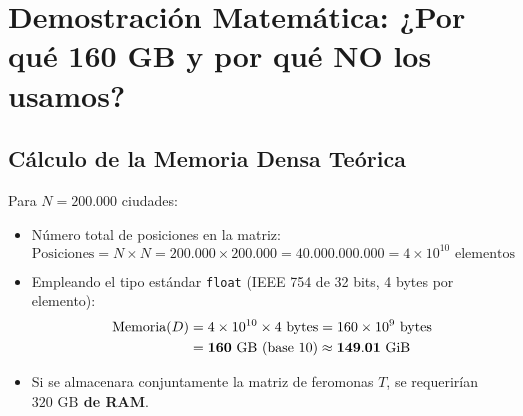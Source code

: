 \documentclass[11pt,a4paper]{article}
\begin{document}
\section{Demostración Matemática: ¿Por qué 160 GB y por qué NO los usamos?}

\subsection{Cálculo de la Memoria Densa Teórica}
Para $N = 200.000$ ciudades:
\begin{itemize}
    \item Número total de posiciones en la matriz:
    \begin{equation}
        \text{Posiciones} = N \times N = 200.000 \times 200.000 = 40.000.000.000 = 4 \times 10^{10} \text{ elementos}
    \end{equation}
    \item Empleando el tipo estándar \texttt{float} (IEEE 754 de 32 bits, 4 bytes por elemento):
    \begin{align}
        \text{Memoria}(D) &= 4 \times 10^{10} \times 4\text{ bytes} = 160 \times 10^9\text{ bytes} \notag \\
        &= \mathbf{160\text{ GB (base 10)}} \approx \mathbf{149.01\text{ GiB}}
    \end{align}
    \item Si se almacenara conjuntamente la matriz de feromonas $T$, se requerirían \textbf{$320\text{ GB}$ de RAM}.
\end{itemize}
\end{document}
